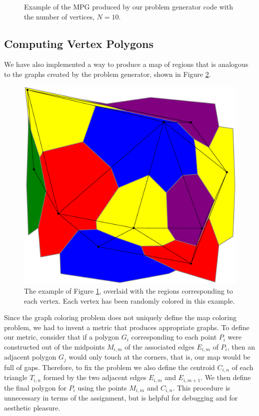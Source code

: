 \documentclass{article}
\begin{document}
\begin{multicols}{2}
\begin{figure}[H]
	\caption{Example of the MPG produced by our problem generator code with the number of vertices, $N=10$.}
	\label{graph_ex}
\end{figure}
\subsection{Computing Vertex Polygons}
We have also implemented a way to produce a map of regions that is analogous to the graphs created by the problem generator, shown in Figure \ref{poly_ex}.  
\begin{figure}[H]
	\centering
	\includegraphics[width=0.9\linewidth]{images/poly_example}
	\caption{The example of Figure \ref{graph_ex}, overlaid with the regions corresponding to each vertex. Each vertex has been randomly colored in this example.}
	\label{poly_ex}
\end{figure}
Since the graph coloring problem does not uniquely define the map coloring problem, we had to invent a metric that produces appropriate graphs. To define our metric, consider that if a polygon $G_i$ corresponding to each point $P_i$ were constructed out of the midpoints $M_{i,m}$ of the associated edges $E_{i,m}$ of $P_i$, then an adjacent polygon $G_j$ would only touch at the corners, that is, our map would be full of gaps. Therefore, to fix the problem we also define the centroid $C_{i,n}$ of each triangle $T_{i,n}$ formed by the two adjacent edges $E_{i,m}$ and $E_{i,m+1}$. We then define the final polygon for $P_i$ using the points $M_{i,m}$ and $C_{i,n}$. This procedure is unnecessary in terms of the assignment, but is helpful for debugging and for aesthetic pleasure.


\end{multicols}
\end{document}
